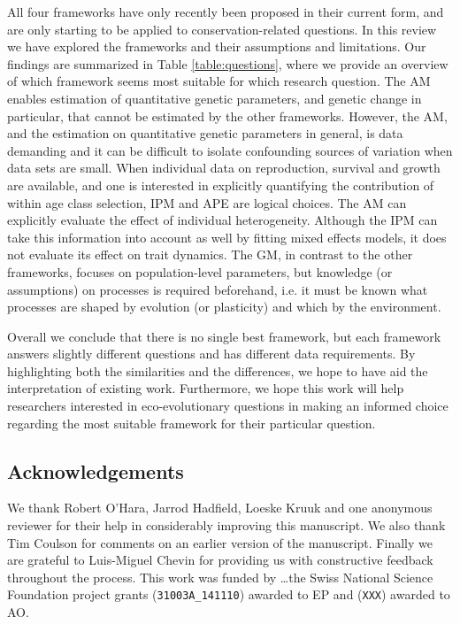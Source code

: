 All four frameworks have only recently been proposed in their current form, and are only starting to be applied to conservation-related questions. In this review we have explored the frameworks and their assumptions and limitations. Our findings are summarized in Table \ref{table:questions}, where we provide an overview of which framework seems most suitable for which research question. The AM enables estimation of quantitative genetic parameters, and genetic change in particular, that cannot be estimated by the other frameworks. However, the AM, and the estimation on quantitative genetic parameters in general, is data demanding and it can be difficult to isolate confounding sources of variation when data sets are small. When individual data on reproduction, survival and growth are available, and one is interested in explicitly quantifying the contribution of within age class selection, IPM and APE are logical choices. The AM can explicitly evaluate the effect of individual heterogeneity. Although the IPM can take this information into account as well by fitting mixed effects models, it does not evaluate its effect on trait dynamics. The GM, in contrast to the other frameworks, focuses on population-level parameters, but knowledge (or assumptions) on processes is required beforehand, i.e. it must be known what processes are shaped by evolution (or plasticity) and which by the environment. 

Overall we conclude that there is no single best framework, but each framework answers slightly different questions and has different data requirements. By highlighting both the similarities and the differences, we hope to have aid the interpretation of existing work. Furthermore, we hope this work will help researchers interested in eco-evolutionary questions in making an informed choice regarding the most suitable framework for their particular question.

\subsection*{Acknowledgements}
We thank Robert O'Hara, Jarrod Hadfield, Loeske Kruuk and one anonymous reviewer for their help in considerably improving this manuscript. We also thank Tim Coulson for comments on an earlier version of the manuscript. Finally we are grateful to Luis-Miguel Chevin for providing us with constructive feedback throughout the process. This work was funded by \dots the Swiss National Science Foundation project grants (\verb|31003A_141110|) awarded to EP and (\verb|XXX|) awarded to AO. 

